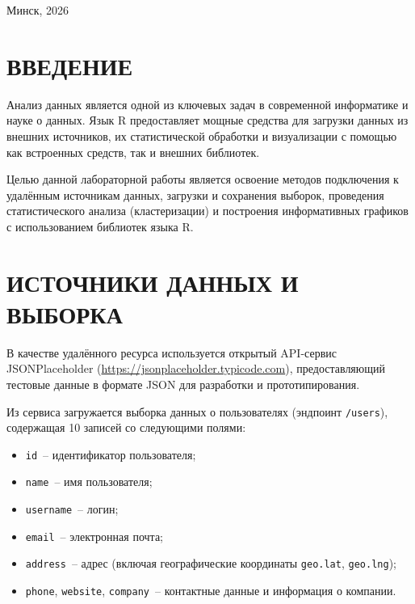 \documentclass[14pt,a4paper]{extarticle}
\begin{document}
\vfill

\begin{center}
Минск, 2026
\end{center}

\newpage

\tableofcontents
\newpage

\section*{ВВЕДЕНИЕ}

Анализ данных является одной из ключевых задач в современной информатике и науке о данных. Язык R предоставляет мощные средства для загрузки данных из внешних источников, их статистической обработки и визуализации с помощью как встроенных средств, так и внешних библиотек.

Целью данной лабораторной работы является освоение методов подключения к удалённым источникам данных, загрузки и сохранения выборок, проведения статистического анализа (кластеризации) и построения информативных графиков с использованием библиотек языка R.

\newpage

\section{ИСТОЧНИКИ ДАННЫХ И ВЫБОРКА}

В качестве удалённого ресурса используется открытый API-сервис JSONPlaceholder (\url{https://jsonplaceholder.typicode.com}), предоставляющий тестовые данные в формате JSON для разработки и прототипирования.

Из сервиса загружается выборка данных о пользователях (эндпоинт \texttt{/users}), содержащая 10 записей со следующими полями:
\begin{itemize}[nosep]
  \item \texttt{id}~-- идентификатор пользователя;
  \item \texttt{name}~-- имя пользователя;
  \item \texttt{username}~-- логин;
  \item \texttt{email}~-- электронная почта;
  \item \texttt{address}~-- адрес (включая географические координаты \texttt{geo.lat}, \texttt{geo.lng});
  \item \texttt{phone}, \texttt{website}, \texttt{company}~-- контактные данные и информация о компании.
\end{itemize}
\end{document}
